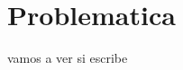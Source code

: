 \documentclass[a4paper]{article}
\begin{document}


\section{Problematica}
\setcounter{page}{1}
	vamos a ver si escribe
\end{document}
